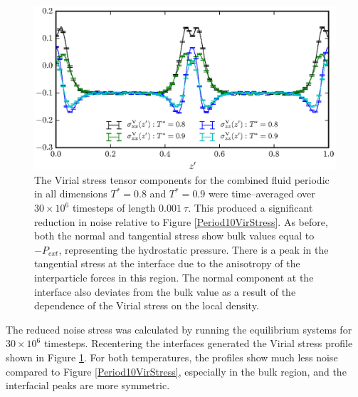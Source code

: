 \begin{figure}[h]
\centering
\includegraphics[scale=1.0]{Period30VirStress}
\caption{The Virial stress tensor components for the combined fluid periodic in all dimensions $T^{*} = 0.8$ and $T^{*} = 0.9$ were time--averaged over $30 \times 10^{6}$ timesteps of length $0.001\ \tau$.
This produced a significant reduction in noise relative to Figure \ref{Period10VirStress}.
As before, both the normal and tangential stress show bulk values equal to $-P_{ext}$, representing the hydrostatic pressure.
There is a peak in the tangential stress at the interface due to the anisotropy of the interparticle forces in this region.
The normal component at the interface also deviates from the bulk value as a result of the dependence of the Virial stress on the local density.
}
\label{Period30VirStress}
\end{figure}

The reduced noise stress was calculated by running the equilibrium systems for $30 \times 10^{6}$ timesteps.
Recentering the interfaces generated the Virial stress profile shown in Figure \ref{Period30VirStress}.
For both temperatures, the profiles show much less noise compared to Figure \ref{Period10VirStress}, especially in the bulk region, and the interfacial peaks are more symmetric.
\FloatBarrier

